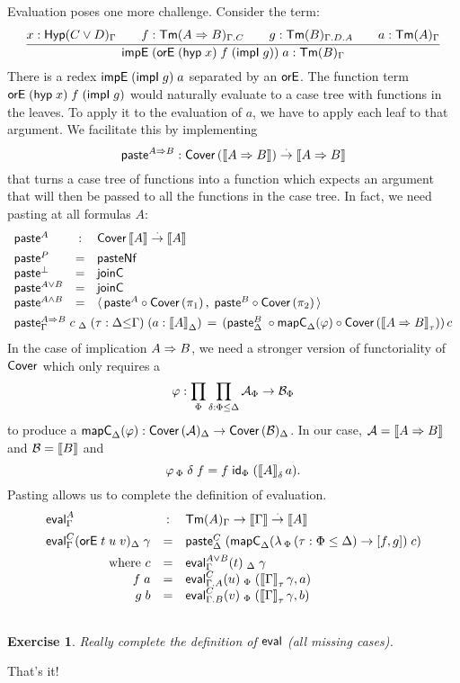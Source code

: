 \documentclass[a4paper]{article}
\newtheorem{exercise}[theorem]{Exercise}
\begin{document}
Evaluation poses one more challenge. Consider the term:
\[
\ru{x : \HypG {C \lor D} \qquad
    f : \Tm[\Gamma.C]{A \imp B} \qquad
    g : \Tm[\Gamma.D.A]{B} \qquad
    a : \TmG A
  }{\impEP{\orE {(\hyp x)} f {(\impI g)}} a : \TmG B}
\]
There is a redex $\impEP {\impI g} a$ separated by an $\torE$.
The function term $\orE {(\hyp x)} f {(\impI g)}$
would naturally evaluate to a case tree with functions in the
leaves.  To apply it to the evaluation of $a$, we have to apply each
leaf to that argument.  We facilitate this by implementing
\[
  \tpaste^{A \imp B} : \Cover{\den{A \imp B}} \todot \den{A \imp B}
\]
that turns a case tree of functions into a function which expects an
argument that will then be passed to all the functions in the case
tree.  In fact, we need pasting at all formulas $A$:
\[
\begin{array}{lcl}
\tpaste^A & : & \tCover\,{\den A} \todot \den A \\[1ex]
\tpaste^P & = & \tpasteNf \\
\tpaste^\bot & = & \tjoinC \\
\tpaste^{A \lor B} & = & \tjoinC \\
\tpaste^{A \land B} & = & \langle\,
  \tpaste^A \comp \Cover{\pi_1} \, , \;
  \tpaste^B \comp \Cover{\pi_2} \,\rangle \\[1ex]
\multicolumn 3 {l} {\paste[\Gamma]{A \imp B} c \;
  _\Delta \; (\tau : \Delta{\leq}\Gamma) \; (a : \den A _\Delta) \, = \,
  (\paste[\Delta]B \comp \mapC[\Delta] \varphi \comp \Cover{\den {A \imp B}_\tau})\, c
}
\end{array}
\]
In the case of implication $A \imp B$,
we need a stronger version of functoriality of $\tCover$ which
only requires a
\[
  \varphi : \prod_{\Phi} \prod_{\delta : \Phi \leq \Delta} \A_\Phi
             \to \B_\Phi
\]
to produce a $\mapC[\Delta]\varphi : \Cover\A_\Delta \to \Cover\B_\Delta$.
In our case, $\A = \den{A \imp B}$ and $\B = \den{B}$ and
\[
  \varphi\,_\Phi\;\delta\;f = f\;\id[\Phi]\;(\den A _\delta\, a)
  .
\]
Pasting allows us to complete the definition of evaluation.
\[
\begin{array}{lcl}
  \teval_\Gamma^A & : & \TmG A \to \den \Gamma \todot \den A \\[1ex]
  \evalG C {\orE t u v} _\Delta \; \gamma & = &
    \paste[\Delta]C
     {(\mapC[\Delta]{\lambda\, _\Phi\, (\tau  : \Phi \leq \Delta) \to [f,g]}\;c)} \\[1ex]
  \multicolumn 1 r {\mbox{ where } c} & = &
      \evalG{A \lor B} t\;_\Delta\;\gamma \\
  \multicolumn 1 r {f\;a} & = &
    \eval[\Gamma.A] C u \;_\Phi\;(\den\Gamma_\tau\,\gamma, a) \\
  \multicolumn 1 r {g\;b} & = &
    \eval[\Gamma.B] C v \;_\Phi\;(\den\Gamma_\tau\,\gamma, b) \\
  \\
\end{array}
\]
\begin{exercise}
  Really complete the definition of $\teval$ (all missing cases).
\end{exercise}
That's it!
\end{document}

